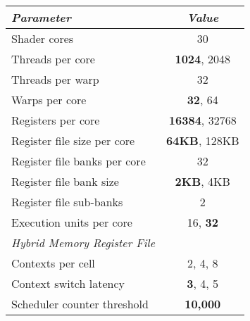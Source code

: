 \begin{scriptsize}
\begin{tabular}{|l|c|}
\hline

 \emph{Parameter} & \emph{Value} \\

\hline

 Shader cores  &  30 \\
 Threads per core &  {\bf 1024}, 2048  \\
 Threads per warp & 32 \\
 Warps per core & {\bf 32}, 64  \\
 Registers per core & {\bf 16384}, 32768 \\
 Register file size per core & {\bf 64KB}, 128KB \\ 
 Register file banks per core & 32 \\
 Register file bank size & {\bf 2KB}, 4KB \\
 Register file sub-banks & 2 \\
 Execution units per core & 16, {\bf 32} \\
\hline 
 \emph{Hybrid Memory Register File} & \\
\hline
 Contexts per cell & 2, 4, 8 \\
 Context switch latency & {\bf 3}, 4, 5 \\
 Scheduler counter threshold & {\bf 10,000}\\
 
 \hline

\end{tabular}
\end{scriptsize}

